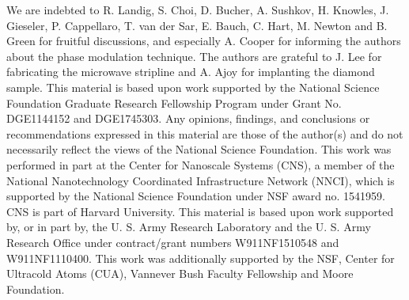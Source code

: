\documentclass[%
 reprint,
 amsmath,amssymb,
 aps,
]{revtex4-1}
\begin{document}
We are indebted to R. Landig, S. Choi, D. Bucher, A. Sushkov, H. Knowles, J. Gieseler, P. Cappellaro, T. van der Sar, E. Bauch, C. Hart, M. Newton and B. Green for fruitful discussions, and especially A. Cooper for informing the authors about the phase modulation technique. The authors are grateful to J. Lee for fabricating the microwave stripline and A. Ajoy for implanting the diamond sample. This material is based upon work supported by the National Science Foundation Graduate Research Fellowship Program under Grant No. DGE1144152 and DGE1745303. Any opinions, findings, and conclusions or recommendations expressed in this material are those of the author(s) and do not necessarily reflect the views of the National Science Foundation. This work was performed in part at the Center for Nanoscale Systems (CNS), a member of the National Nanotechnology Coordinated Infrastructure Network (NNCI), which is supported by the National Science Foundation under NSF award no. 1541959. CNS is part of Harvard University. This material is based upon work supported by, or in part by, the U. S. Army Research Laboratory and the U. S. Army Research Office under contract/grant numbers W911NF1510548 and W911NF1110400. This work was additionally supported by the NSF, Center for Ultracold Atoms (CUA), Vannever Bush Faculty Fellowship and Moore Foundation.
\end{document}

